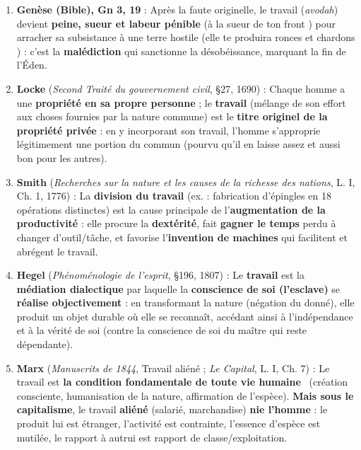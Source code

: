 \documentclass[11pt]{article}
\begin{document}
\begin{corrige}
\begin{enumerate}
\item \textbf{Genèse (Bible), Gn 3, 19} : \guillemotleft Après la faute originelle, le travail (\emph{avodah}) devient \textbf{peine, sueur et labeur pénible} (\guillemotleft à la sueur de ton front \guillemotright) pour arracher sa subsistance à une terre hostile (\guillemotleft elle te produira ronces et chardons \guillemotright) : c'est la \textbf{malédiction} qui sanctionne la désobéissance, marquant la fin de l'Éden. \guillemotright
\item \textbf{Locke} (\emph{Second Traité du gouvernement civil}, §27, 1690) : \guillemotleft Chaque homme a une \textbf{propriété en sa propre personne} ; le \textbf{travail} (mélange de son effort aux choses fournies par la nature commune) est le \textbf{titre originel de la propriété privée} : en y incorporant son travail, l'homme s'approprie légitimement une portion du commun (pourvu qu'il en laisse \guillemotleft assez et aussi bon \guillemotright pour les autres). \guillemotright
\item \textbf{Smith} (\emph{Recherches sur la nature et les causes de la richesse des nations}, L. I, Ch. 1, 1776) : \guillemotleft La \textbf{division du travail} (ex. : fabrication d'épingles en 18 opérations distinctes) est la cause principale de l'\textbf{augmentation de la productivité} : elle procure la \textbf{dextérité}, fait \textbf{gagner le temps} perdu à changer d'outil/tâche, et favorise l'\textbf{invention de machines} qui facilitent et abrégent le travail. \guillemotright
\item \textbf{Hegel} (\emph{Phénoménologie de l'esprit}, §196, 1807) : \guillemotleft Le \textbf{travail} est la \textbf{médiation dialectique} par laquelle la \textbf{conscience de soi (l'esclave)} se \textbf{réalise objectivement} : en transformant la nature (négation du donné), elle produit un objet durable où elle se reconnaît, accédant ainsi à l'indépendance et à la vérité de soi (contre la conscience de soi du maître qui reste dépendante). \guillemotright
\item \textbf{Marx} (\emph{Manuscrits de 1844}, \guillemotleft Travail aliéné \guillemotright ; \emph{Le Capital}, L. I, Ch. 7) : \guillemotleft Le travail est \guillemotleft \textbf{la condition fondamentale de toute vie humaine} \guillemotright\ (création consciente, humanisation de la nature, affirmation de l'espèce). \textbf{Mais sous le capitalisme}, le travail \textbf{aliéné} (salarié, marchandise) \textbf{nie l'homme} : le produit lui est étranger, l'activité est contrainte, l'essence d'espèce est mutilée, le rapport à autrui est rapport de classe/exploitation. \guillemotright

\end{enumerate}
\end{corrige}
\end{document}
